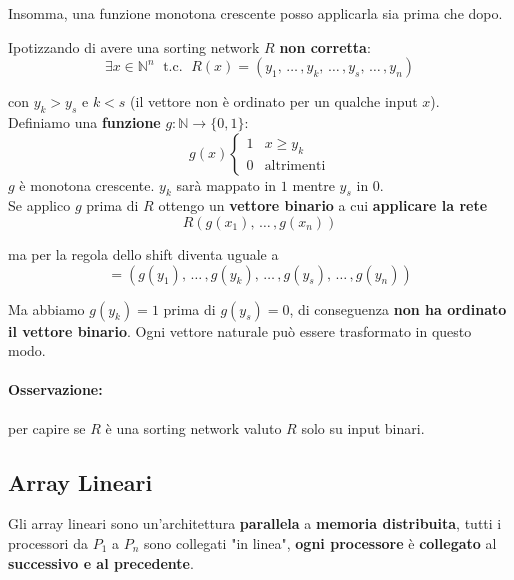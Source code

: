 Insomma, una funzione monotona crescente posso applicarla sia prima che dopo.\\

\newpage

Ipotizzando di avere una sorting network $R$ \textbf{non corretta}: 
$$ \exists x \in \mathbb{N}^n \; \text{ t.c. } \; R(x) = (y_1, \, \dots \, , y_k, \, \dots \, , y_s, \, \dots \, , y_n)$$

con $y_k > y_s$ e $k<s$ (il vettore non è ordinato per un qualche input $x$).\\

Definiamo una \textbf{funzione} $g: \mathbb{N} \rightarrow \{0,1\}$:
$$ 
g(x) \begin{cases}
	1  & x \geq y_k \\
	0 & \text{altrimenti}
\end{cases}
$$
$g$ è monotona crescente. $y_k$ sarà mappato in $1$ mentre $y_s$ in $0$.\\

Se applico $g$ prima di $R$ ottengo un \textbf{vettore binario} a cui \textbf{applicare la rete}
$$ R\left(g(x_1), \, \dots \, , g(x_n)\right)$$

ma per la regola dello shift diventa uguale a 
$$ = \left(g(y_1), \, \dots \, , g(y_k), \, \dots \, , g(y_s), \, \dots \, , g(y_n) \right)$$

Ma abbiamo $g(y_k) = 1$ prima di $g(y_s) = 0$, di conseguenza \textbf{non ha ordinato il vettore binario}. Ogni vettore naturale può essere trasformato in questo modo.\\

\paragraph{Osservazione:} per capire se $R$ è una sorting network valuto $R$ solo su input binari.\\


\newpage

\subsection{Array Lineari}

Gli array lineari sono un'architettura \textbf{parallela} a \textbf{memoria distribuita}, tutti i processori da $P_1$ a $P_n$ sono collegati "in linea", \textbf{ogni processore} è \textbf{collegato} al \textbf{successivo e al precedente}.\\

